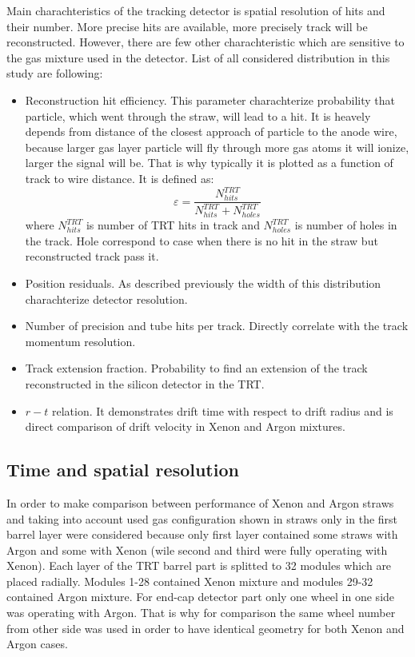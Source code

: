 Main charachteristics of the tracking detector is spatial resolution of hits and their number. 
More precise hits are available, more precisely track will be reconstructed.
However, there are few other charachteristic which are sensitive to the gas mixture used in the detector.
List of all considered distribution in this study are following:
\begin{itemize}
 \item Reconstruction hit efficiency. This parameter charachterize probability that particle, which went through the straw, will lead to a hit.
 It is heavely depends from distance of the closest approach of particle to the anode wire, because larger gas layer particle will fly through more gas atoms it will
 ionize, larger the signal will be. That is why typically it is plotted as a function of track to wire distance. It is defined as:
 \begin{equation}
  \varepsilon = \dfrac{N^{TRT}_{hits}}{N^{TRT}_{hits} + N^{TRT}_{holes}}
 \label{eq:hit_eff}
 \end{equation}
 where $N^{TRT}_{hits}$ is number of TRT hits in track and $N^{TRT}_{holes}$ is number of holes in the track. Hole correspond to case when there is no hit in the straw
 but reconstructed track pass it.
 \item Position residuals. As described previously the width of this distribution charachterize detector resolution.
 \item Number of precision and tube hits per track. Directly correlate with the track momentum resolution.
 \item Track extension fraction. Probability to find an extension of the track reconstructed in the silicon detector in the TRT.
 \item $r-t$ relation. It demonstrates drift time with respect to drift radius and is direct comparison of drift velocity in Xenon and Argon mixtures.
\end{itemize}


\subsection{Time and spatial resolution}
\label{subsec:TRT:trackPerf}

In order to make comparison between performance of Xenon and Argon straws and taking into account used gas configuration shown in  
straws only in the first barrel layer were considered because only first layer contained some straws with Argon and some with Xenon 
(wile second and third were fully operating with Xenon).
Each layer of the TRT barrel part is splitted to 32 modules which are placed radially. 
Modules 1-28 contained Xenon mixture and modules 29-32 contained Argon mixture.
For end-cap detector part only one wheel in one side was operating with Argon. That is why for comparison the same wheel number from other side was used in order
to have identical geometry for both Xenon and Argon cases.


